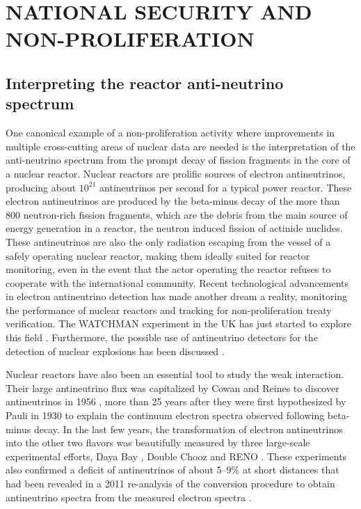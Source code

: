 \documentclass[letterpaper]{ar-1col}
\begin{document}
\section{NATIONAL SECURITY AND NON-PROLIFERATION}



\subsection{Interpreting the reactor anti-neutrino spectrum}

One canonical example of a non-proliferation activity where improvements in multiple cross-cutting areas of nuclear data are needed is the interpretation of the anti-neutrino spectrum from the prompt decay of fission fragments in the core of a nuclear reactor.
Nuclear reactors are prolific sources of electron antineutrinos, producing about $10^{21}$ antineutrinos per second for a typical power reactor.
 These electron antineutrinos are produced by the beta-minus decay of the more than 800 neutron-rich fission fragments, which are the debris from the main source of energy generation in a reactor, the neutron induced fission of actinide nuclides.
 These antineutrinos are also the only radiation escaping from the vessel of a safely operating nuclear reactor, making them ideally suited for reactor monitoring, even in the event that the actor operating the reactor refuses to cooperate with the international community.
 Recent technological advancements in electron antineutrino detection has made another dream a reality, monitoring the performance of nuclear reactors and tracking  for non-proliferation treaty verification.
  The WATCHMAN experiment in the UK has just started to explore this field \cite{Cha18}.
 Furthermore, the possible use of antineutrino detectors for the detection of nuclear explosions has been discussed \cite{CarAx}.
 
Nuclear reactors have also been an essential tool to study the weak interaction.
 Their large antineutrino flux was capitalized by Cowan and Reines to discover antineutrinos in 1956 \cite{Cow56}, more than 25 years after they were first hypothesized by Pauli in 1930 to explain the continuum electron spectra observed following beta-minus decay.
  In the last few years, the transformation of electron antineutrinos into the other two flavors was beautifully measured by three large-scale experimental efforts, Daya Bay \cite{An16}, Double Chooz \cite{Abe12} and RENO \cite{Cho16}.
  These experiments also confirmed a deficit of antineutrinos of about 5--9\% at short distances that had been revealed in a 2011 re-analysis of the conversion procedure to obtain antineutrino spectra from the measured electron spectra \cite{Men11}.
\end{document}
